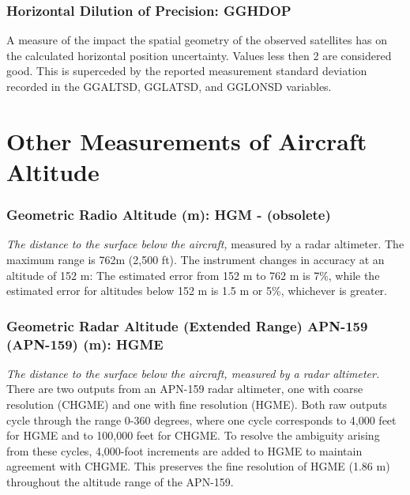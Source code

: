 \documentclass[
  english,
]{book}
\begin{document}
\hypertarget{horizontal-dilution-of-precision-gghdop}{%
\subsubsection{Horizontal Dilution of Precision:
GGHDOP}\label{horizontal-dilution-of-precision-gghdop}}

A measure of the impact the spatial geometry of the observed satellites
has on the calculated horizontal position uncertainty. Values less then
2 are considered good. This is superceded by the reported measurement
standard deviation recorded in the GGALTSD, GGLATSD, and GGLONSD
variables.

\hypertarget{other-measurements-of-aircraft-altitude}{%
\section{Other Measurements of Aircraft
Altitude}\label{other-measurements-of-aircraft-altitude}}

\hypertarget{hgm}{%
\subsubsection*{Geometric Radio Altitude (m): HGM -
(obsolete)}\label{hgm}}

\emph{The distance to the surface below the aircraft,} measured by a
radar altimeter. The maximum range is 762m (2,500 ft). The instrument
changes in accuracy at an altitude of 152 m: The estimated error from
152 m to 762 m is 7\%, while the estimated error for altitudes below 152
m is 1.5 m or 5\%, whichever is greater.

\hypertarget{hgme-159}{%
\subsubsection*{Geometric Radar Altitude (Extended Range) APN-159
(APN-159) (m): HGME}\label{hgme-159}}

\emph{The distance to the surface below the aircraft, measured by a
radar altimeter.} There are two outputs from an APN-159 radar altimeter,
one with coarse resolution (CHGME) and one with fine resolution (HGME).
Both raw outputs cycle through the range 0-360 degrees, where one cycle
corresponds to 4,000 feet for HGME and to 100,000 feet for CHGME. To
resolve the ambiguity arising from these cycles, 4,000-foot increments
are added to HGME to maintain agreement with CHGME. This preserves the
fine resolution of HGME (1.86 m) throughout the altitude range of the
APN-159.
\end{document}
